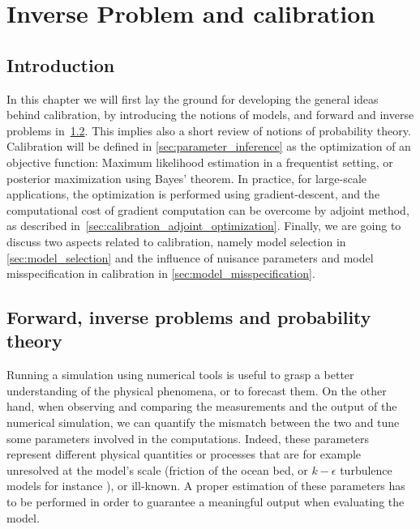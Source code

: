\documentclass[../../Main_ManuscritThese.tex]{subfiles}
\begin{document}
\chapter{Inverse Problem and calibration}
\label{chap:inverse_problem}

\minitoc
\newpage
\subfileLocal{\pagestyle{contentStyle}}

\section{Introduction}
\label{sec:intro_chap2}
In this chapter we will first lay the ground for developing the general ideas behind calibration, by introducing the notions of models, and forward and inverse problems in~\cref{sec:forward_inverse_problem_proba_theory}. This implies also a short review of notions of probability theory. Calibration will be defined in \cref{sec:parameter_inference} as the optimization of an objective function: Maximum likelihood estimation in a frequentist setting, or posterior maximization using Bayes' theorem. In practice, for large-scale applications, the optimization is performed using gradient-descent, and the computational cost of gradient computation can be overcome by adjoint method, as described in~\cref{sec:calibration_adjoint_optimization}. Finally, we are going to discuss two aspects related to calibration, namely model selection in \cref{sec:model_selection} and the influence of nuisance parameters and model misspecification in calibration in \cref{sec:model_misspecification}.

\section{Forward, inverse problems and probability theory}
\label{sec:forward_inverse_problem_proba_theory}
Running a simulation using numerical tools is useful to grasp a better understanding of the physical phenomena, or to forecast them. On the other hand, when observing and comparing the measurements and the output of the numerical simulation, we can quantify the mismatch between the two and tune some parameters involved in the computations. Indeed, these parameters represent different physical quantities or processes that are for example unresolved at the model's scale (friction of the ocean bed, or $k-\epsilon$ turbulence models for instance ), or ill-known. A proper estimation of these parameters has to be performed in order to guarantee a meaningful output when evaluating the model.
\end{document}
